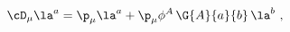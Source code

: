 \begin{equation}
  \cD_\mu \la^a = \p_\mu \la^a + \p_\mu \phi^A\, \G{A}{a}{b}\, \la^b\ ,
 \end{equation}


